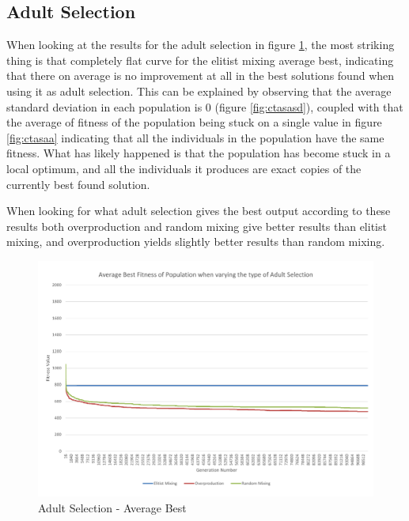\clearpage

\subsection{Adult Selection} %
\label{sub:adult_selection}

When looking at the results for the adult selection in figure \ref{fig:ctasab}, the most striking thing is that completely flat curve for the elitist mixing average best, indicating that there on average is no improvement at all in the best solutions found when using it as adult selection. This can be explained by observing that the average standard deviation in each population is 0 (figure \ref{fig:ctasasd}), coupled with that the average of fitness of the population being stuck on a single value in figure \ref{fig:ctasaa} indicating that all the individuals in the population have the same fitness. What has likely happened is that the population has become stuck in a local optimum, and all the individuals it produces are exact copies of the currently best found solution.

When looking for what adult selection gives the best output according to these results both overproduction and random mixing give better results than elitist mixing, and overproduction yields slightly better results than random mixing.

\begin{landscape}
\begin{figure}[thbp]
	\centerline{\includegraphics[height=0.945\textwidth]{figures/CircleTests/AdultSelection/CircleTestAdultSelectionAverageBest.pdf}}
	\caption{Adult Selection - Average Best}
	\label{fig:ctasab}
\end{figure}
\end{landscape}

